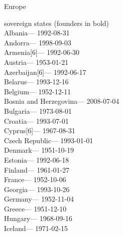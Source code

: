 Europe

sovereign states (founders in bold)\\
\hspace*{0.333em}Albania--- 1992-08-31\\
\hspace*{0.333em}Andorra--- 1998-09-03\\
\hspace*{0.333em}Armenia{[}6{]}--- 1992-06-30\\
\hspace*{0.333em}Austria--- 1953-01-21\\
\hspace*{0.333em}Azerbaijan{[}6{]}--- 1992-06-17\\
\hspace*{0.333em}Belarus--- 1993-12-16\\
\hspace*{0.333em}Belgium--- 1952-12-11\\
\hspace*{0.333em}Bosnia and Herzegovina--- 2008-07-04\\
\hspace*{0.333em}Bulgaria--- 1973-08-01\\
\hspace*{0.333em}Croatia--- 1993-07-01\\
\hspace*{0.333em}Cyprus{[}6{]}--- 1967-08-31\\
\hspace*{0.333em}Czech Republic--- 1993-01-01\\
\hspace*{0.333em}Denmark--- 1951-10-19\\
\hspace*{0.333em}Estonia--- 1992-06-18\\
\hspace*{0.333em}Finland--- 1961-01-27\\
\hspace*{0.333em}France--- 1952-10-06\\
\hspace*{0.333em}Georgia--- 1993-10-26\\
\hspace*{0.333em}Germany--- 1952-11-04\\
\hspace*{0.333em}Greece--- 1951-12-10\\
\hspace*{0.333em}Hungary--- 1968-09-16\\
\hspace*{0.333em}Iceland--- 1971-02-15\\
